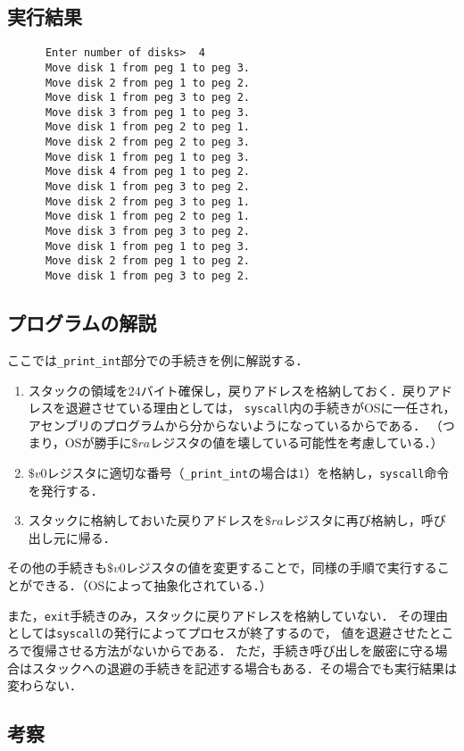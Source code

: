 \documentclass[a4j,11pt]{jarticle}
\begin{document}
\subsection{実行結果}
\begin{verbatim}
      Enter number of disks>  4
      Move disk 1 from peg 1 to peg 3.
      Move disk 2 from peg 1 to peg 2.
      Move disk 1 from peg 3 to peg 2.
      Move disk 3 from peg 1 to peg 3.
      Move disk 1 from peg 2 to peg 1.
      Move disk 2 from peg 2 to peg 3.
      Move disk 1 from peg 1 to peg 3.
      Move disk 4 from peg 1 to peg 2.
      Move disk 1 from peg 3 to peg 2.
      Move disk 2 from peg 3 to peg 1.
      Move disk 1 from peg 2 to peg 1.
      Move disk 3 from peg 3 to peg 2.
      Move disk 1 from peg 1 to peg 3.
      Move disk 2 from peg 1 to peg 2.
      Move disk 1 from peg 3 to peg 2.           
\end{verbatim}

\subsection{プログラムの解説}
ここでは{\tt \_print\_int}部分での手続きを例に解説する．
\begin{enumerate}
      \item スタックの領域を$24$バイト確保し，戻りアドレスを格納しておく．戻りアドレスを退避させている理由としては，
      {\tt syscall}内の手続きがOSに一任され，アセンブリのプログラムから分からないようになっているからである．
      （つまり，OSが勝手に$\$ra$レジスタの値を壊している可能性を考慮している．）
      \item $\$v0$レジスタに適切な番号（{\tt \_print\_int}の場合は$1$）を格納し，{\tt syscall}命令を発行する．
      \item スタックに格納しておいた戻りアドレスを$\$ra$レジスタに再び格納し，呼び出し元に帰る．
\end{enumerate}

その他の手続きも$\$v0$レジスタの値を変更することで，同様の手順で実行することができる．（OSによって抽象化されている．）

また，{\tt exit}手続きのみ，スタックに戻りアドレスを格納していない．
その理由としては{\tt syscall}の発行によってプロセスが終了するので，
値を退避させたところで復帰させる方法がないからである．
ただ，手続き呼び出しを厳密に守る場合はスタックへの退避の手続きを記述する場合もある．その場合でも実行結果は変わらない．

\subsection{考察}
\end{document}
